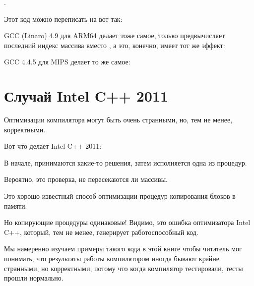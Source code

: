 .

Этот код можно переписать на \CCpp вот так:



GCC (Linaro) 4.9 для ARM64 делает тоже самое, только предвычисляет последний индекс массива  вместо
, а это, конечно, имеет тот же эффект:




GCC 4.4.5 для MIPS делает то же самое:



\section{Случай Intel C++ 2011}
\myindex{\CompilerAnomaly}
\label{loops_iterators_loop_anomaly}

Оптимизации компилятора могут быть очень странными, но, тем не менее, корректными.

Вот что делает Intel C++ 2011:



В начале, принимаются какие-то решения, затем исполняется одна из процедур.

Вероятно, это проверка, не пересекаются ли массивы.

Это хорошо известный способ оптимизации процедур копирования блоков в памяти.

Но копирующие процедуры одинаковые!
Видимо, это ошибка оптимизатора Intel C++, который, тем не менее, генерирует работоспособный код.

Мы намеренно изучаем примеры такого кода в этой книге чтобы читатель мог понимать, что результаты работы
компилятором иногда бывают крайне странными, но корректными, потому что когда компилятор тестировали, 
тесты прошли нормально.%

